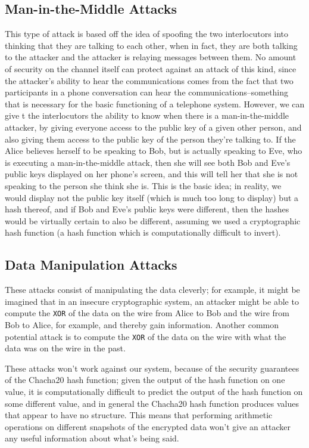 \documentclass[a4paper]{report}
\begin{document}
\subsection{Man-in-the-Middle Attacks}

This type of attack is based off the idea of spoofing the two interlocutors into thinking that they are talking to each other, when in fact, they are both talking to the attacker and the attacker is relaying messages between them. No amount of security on the channel itself can protect against an attack of this kind, since the attacker's ability to hear the communications comes from the fact that two participants in a phone conversation can hear the communications--something that is necessary for the basic functioning of a telephone system. However, we can give t the interlocutors the ability to know when there is a man-in-the-middle attacker, by giving everyone access to the public key of a given other person, and also giving them access to the public key of the person they're talking to. If the Alice believes herself to be speaking to Bob, but is actually speaking to Eve, who is executing a man-in-the-middle attack, then she will %
see both Bob and Eve's public keys displayed on her phone's screen, and this will %
tell her that she is not speaking to the person she think she is. This is the basic idea; in reality, we would display not the public key itself (which is much too long to display) but a hash thereof, and if Bob and Eve's public keys were different, then the hashes would be virtually certain to also be different, assuming we used a cryptographic hash function (a hash function which is computationally difficult to invert).

\subsection{Data Manipulation Attacks}

These attacks consist of manipulating the data cleverly; for example, it might be imagined that in an insecure cryptographic system, an attacker might be able to compute the \verb|XOR| of the data on the wire from Alice to Bob and the wire from Bob to Alice, for example, and thereby gain information. Another common potential attack is to compute the \verb|XOR| of the data on the wire with what the data was on the wire in the past. 

These attacks won't work against our system, because of the security guarantees of the Chacha20 hash function; given the output of the hash function on one value, it is computationally difficult to predict the output of the hash function on some different value, and in general the Chacha20 hash function produces values that appear to have no structure. This means that performing arithmetic operations on different snapshots of the encrypted data won't give an attacker any useful information about what's being said.
\end{document}
